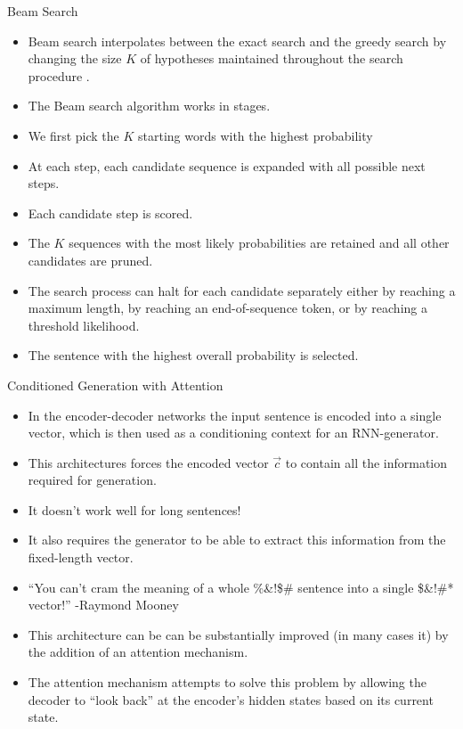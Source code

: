 \documentclass[handout]{beamer}
\begin{document}
\begin{frame}{Beam Search}
\begin{scriptsize}
\begin{itemize}
\item Beam search interpolates between the exact search and the greedy search by changing the size $K$ of hypotheses maintained throughout the search procedure \cite{cho2015natural}.
\item The Beam search algorithm works in stages.
\item  We first pick the $K$ starting words with the highest probability 
\item At each step, each candidate sequence is expanded with all possible next steps. 
\item Each candidate step is scored. 
\item The $K$ sequences with the most likely probabilities are retained and all other candidates are pruned. 
\item The search process can halt for each candidate separately either by reaching a maximum length, by reaching an end-of-sequence token, or by reaching a threshold likelihood.
\item The sentence with the highest overall probability is selected.
\end{itemize}
        
\end{scriptsize}
\end{frame}





\begin{frame}{Conditioned Generation with Attention}
\begin{scriptsize}
\begin{itemize}
\item In the encoder-decoder networks the input sentence is encoded into a single vector, which is then used as a conditioning context for an RNN-generator. 
\item This architectures forces the encoded vector $\vec{c}$ to contain all the information required for generation.
\item It doesn't work well for long sentences!
\item It also requires the generator to be able to extract this information from the fixed-length vector.
\item ``You can't cram the meaning of a whole \%\&!\$\# sentence into a single \$\&!\#* vector!'' -Raymond Mooney
\item This architecture can be can be substantially improved (in many cases it) by the addition of an attention mechanism.
\item The attention mechanism attempts to solve this problem by allowing the decoder to “look back” at the encoder’s hidden states based on its current state. 
\end{itemize}
\end{scriptsize}
\end{frame}
\end{document}
